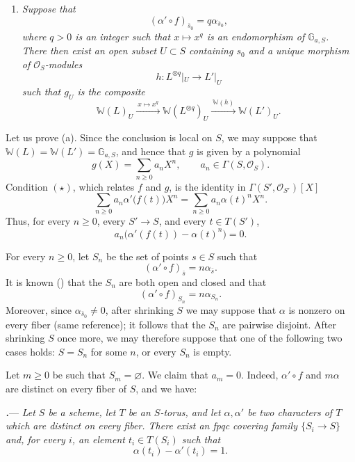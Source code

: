 \begin{enumerate}
\item[\textup{\SGAInlineRefTarget{sga3:xix:proposition:4:12:item:c}(c)}]
\textit{Suppose that}
\[
  (\alpha'\circ f)_{\bar s_0}=q\alpha_{\bar s_0},
\]
\textit{where \(q>0\) is an integer such that
\(x\longmapsto x^q\) is an endomorphism of
\(\mathbb G_{a,S}\).  There then exist an open subset \(U\subset S\)
containing \(s_0\) and a unique morphism of
\(\mathcal O_S\)-modules}
\[
  h\colon L^{\otimes q}|_U\longrightarrow L'|_U
\]
\textit{such that \(g_U\) is the composite}
\[
  \mathbb W(L)_U
  \xrightarrow{\ x\mapsto x^q\ }
  \mathbb W(L^{\otimes q})_U
  \xrightarrow{\ \mathbb W(h)\ }
  \mathbb W(L')_U.
\]
\end{enumerate}

Let us prove \textup{(a)}.  Since the conclusion is local on \(S\),
we may suppose that
\(\mathbb W(L)=\mathbb W(L')=\mathbb G_{a,S}\), and hence that \(g\)
is given by a polynomial
\[
  g(X)=\sum_{n\geq0}a_nX^n,
  \qquad
  a_n\in\Gamma(S,\mathcal O_S).
\]
Condition \textup{\((\star)\)}, which relates \(f\) and \(g\), is the
identity in \(\Gamma(S',\mathcal O_{S'})[X]\)
\[
  \sum_{n\geq0}a_n\alpha'\bigl(f(t)\bigr)X^n
  =
  \sum_{n\geq0}a_n\alpha(t)^nX^n.
\]
Thus, for every \(n\geq0\), every \(S'\to S\), and every
\(t\in T(S')\),
\[
  a_n\bigl(\alpha'(f(t))-\alpha(t)^n\bigr)=0.
\]

For every \(n\geq0\), let \(S_n\) be the set of points \(s\in S\)
such that
\[
  (\alpha'\circ f)_{\bar s}=n\alpha_{\bar s}.
\]
It is known \textup{()} that the \(S_n\) are both open
and closed and that
\[
  (\alpha'\circ f)_{S_n}=n\alpha_{S_n}.
\]
Moreover, since \(\alpha_{\bar s_0}\ne0\), after shrinking \(S\) we
may suppose that \(\alpha\) is nonzero on every fiber \textup{(same
reference)}; it follows that the \(S_n\) are pairwise disjoint.
After shrinking \(S\) once more, we may therefore suppose that one
of the following two cases holds: \(S=S_n\) for some \(n\), or every
\(S_n\) is empty.

Let \(m\geq0\) be such that \(S_m=\varnothing\).  We claim that
\(a_m=0\).  Indeed, \(\alpha'\circ f\) and \(m\alpha\) are distinct
on every fiber of \(S\), and we have:

\par\medskip\noindent
\textbf{\textit{.}}---
\textit{Let \(S\) be a scheme, let \(T\) be an \(S\)-torus, and let
\(\alpha,\alpha'\) be two characters of \(T\) which are distinct on
every fiber.  There exist an fpqc covering family
\(\{S_i\to S\}\) and, for every \(i\), an element \(t_i\in T(S_i)\)
such that}
\[
  \alpha(t_i)-\alpha'(t_i)=1.
\]

